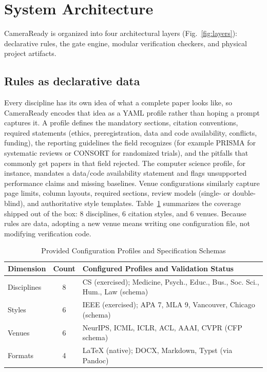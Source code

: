 \documentclass[conference]{IEEEtran}
\begin{document}
\section{System Architecture}
\label{sec:arch}

CameraReady is organized into four architectural layers (Fig.~\ref{fig:layers}): declarative rules, the gate engine, modular verification checkers, and physical project artifacts.

\subsection{Rules as declarative data}
Every discipline has its own idea of what a complete paper looks like, so CameraReady encodes that idea as a YAML profile rather than hoping a prompt captures it. A profile defines the mandatory sections, citation conventions, required statements (ethics, preregistration, data and code availability, conflicts, funding), the reporting guidelines the field recognizes (for example PRISMA for systematic reviews or CONSORT for randomized trials), and the pitfalls that commonly get papers in that field rejected. The computer science profile, for instance, mandates a data/code availability statement and flags unsupported performance claims and missing baselines. Venue configurations similarly capture page limits, column layouts, required sections, review models (single- or double-blind), and authoritative style templates. Table~\ref{tab:coverage} summarizes the coverage shipped out of the box: 8 disciplines, 6 citation styles, and 6 venues. Because rules are data, adopting a new venue means writing one configuration file, not modifying verification code.

\begin{table}[t]
\centering
\caption{Provided Configuration Profiles and Specification Schemas}
\label{tab:coverage}
\renewcommand{\arraystretch}{1.0}
\setlength{\tabcolsep}{3.5pt}
\footnotesize
\begin{tabular}{@{}lc>{\raggedright\arraybackslash}p{5.2cm}@{}}
\toprule
\textbf{Dimension} & \textbf{Count} & \textbf{Configured Profiles and Validation Status} \\
\midrule
\rowcolor{rowtint} Disciplines & 8 & CS (exercised); Medicine, Psych., Educ., Bus., Soc. Sci., Hum., Law (schema) \\
Styles & 6 & IEEE (exercised); APA 7, MLA 9, Vancouver, Chicago (schema) \\
\rowcolor{rowtint} Venues & 6 & NeurIPS, ICML, ICLR, ACL, AAAI, CVPR (CFP schema) \\
Formats & 4 & \LaTeX{} (native); DOCX, Markdown, Typst (via Pandoc) \\
\bottomrule
\end{tabular}
\end{table}
\end{document}
